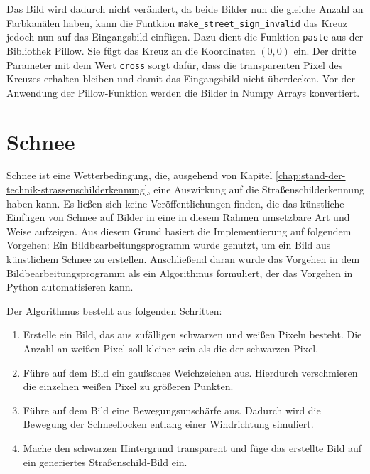 Das Bild wird dadurch nicht verändert, da beide Bilder nun die gleiche Anzahl an Farbkanälen haben, kann die Funtkion \texttt{make_street_sign_invalid} das Kreuz jedoch nun auf das Eingangsbild einfügen. Dazu dient die Funktion \texttt{paste} aus der Bibliothek Pillow. Sie fügt das Kreuz an die Koordinaten $(0,0)$ ein. Der dritte Parameter mit dem Wert \texttt{cross} sorgt dafür, dass die transparenten Pixel des Kreuzes erhalten bleiben und damit das Eingangsbild nicht überdecken. Vor der Anwendung der Pillow-Funktion werden die Bilder in Numpy Arrays konvertiert. \cite{pillow}

\section{Schnee}

Schnee ist eine Wetterbedingung, die, ausgehend von Kapitel \ref{chap:stand-der-technik-strassenschilderkennung}, eine Auswirkung auf die Straßenschilderkennung haben kann. Es ließen sich keine Veröffentlichungen finden, die das künstliche Einfügen von Schnee auf Bilder in eine in diesem Rahmen umsetzbare Art und Weise aufzeigen. Aus diesem Grund basiert die Implementierung auf folgendem Vorgehen: Ein Bildbearbeitungsprogramm wurde genutzt, um ein Bild aus künstlichem Schnee zu erstellen. Anschließend daran wurde das Vorgehen in dem Bildbearbeitungsprogramm als ein Algorithmus formuliert, der das Vorgehen in Python automatisieren kann.

Der Algorithmus besteht aus folgenden Schritten:
\begin{enumerate}
  \item Erstelle ein Bild, das aus zufälligen schwarzen und weißen Pixeln besteht. Die Anzahl an weißen Pixel soll kleiner sein als die der schwarzen Pixel.
  \item Führe auf dem Bild ein gaußsches Weichzeichen aus. Hierdurch verschmieren die einzelnen weißen Pixel zu größeren Punkten.
  \item Führe auf dem Bild eine Bewegungsunschärfe aus. Dadurch wird die Bewegung der Schneeflocken entlang einer Windrichtung simuliert.
  \item Mache den schwarzen Hintergrund transparent und füge das erstellte Bild auf ein generiertes Straßenschild-Bild ein.
\end{enumerate}

